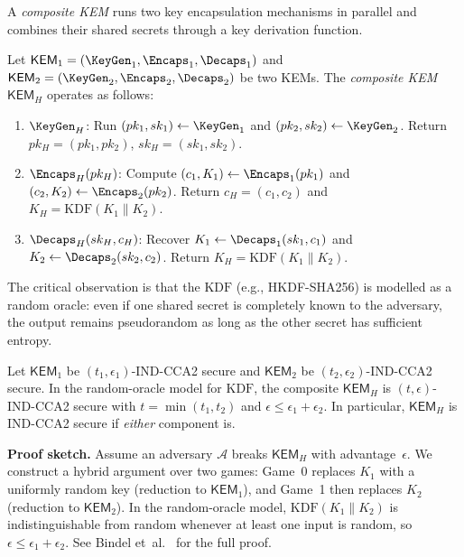 A \emph{composite KEM} runs two key encapsulation mechanisms in parallel and combines their shared secrets through a key derivation function.

\begin{definition}
\label{def:composite-kem}
Let $\mathsf{KEM}_1 = (\KeyGen_1, \Encaps_1, \Decaps_1)$ and $\mathsf{KEM}_2 = (\KeyGen_2, \Encaps_2, \Decaps_2)$ be two KEMs.  The \emph{composite KEM} $\mathsf{KEM}_H$ operates as follows:
\begin{enumerate}
\item $\KeyGen_H$: Run $(pk_1, sk_1) \gets \KeyGen_1$ and $(pk_2, sk_2) \gets \KeyGen_2$.  Return $pk_H = (pk_1, pk_2)$, $sk_H = (sk_1, sk_2)$.
\item $\Encaps_H(pk_H)$: Compute $(c_1, K_1) \gets \Encaps_1(pk_1)$ and $(c_2, K_2) \gets \Encaps_2(pk_2)$.  Return $c_H = (c_1, c_2)$ and $K_H = \mathrm{KDF}(K_1 \| K_2)$.
\item $\Decaps_H(sk_H, c_H)$: Recover $K_1 \gets \Decaps_1(sk_1, c_1)$ and $K_2 \gets \Decaps_2(sk_2, c_2)$.  Return $K_H = \mathrm{KDF}(K_1 \| K_2)$.
\end{enumerate}
\end{definition}

The critical observation is that the $\mathrm{KDF}$ (e.g., HKDF-SHA256) is modelled as a random oracle: even if one shared secret is completely known to the adversary, the output remains pseudorandom as long as the other secret has sufficient entropy.

\begin{theorem}
\label{thm:hybrid-kem-security}
Let $\mathsf{KEM}_1$ be $(t_1, \epsilon_1)$-IND-CCA2 secure and $\mathsf{KEM}_2$ be $(t_2, \epsilon_2)$-IND-CCA2 secure.  In the random-oracle model for $\mathrm{KDF}$, the composite $\mathsf{KEM}_H$ is $(t, \epsilon)$-IND-CCA2 secure with $t = \min(t_1, t_2)$ and $\epsilon \leq \epsilon_1 + \epsilon_2$.  In particular, $\mathsf{KEM}_H$ is IND-CCA2 secure if \emph{either} component is.
\end{theorem}

\begin{svgraybox}
\textbf{Proof sketch.}  Assume an adversary $\mathcal{A}$ breaks $\mathsf{KEM}_H$ with advantage~$\epsilon$.  We construct a hybrid argument over two games: Game~0 replaces $K_1$ with a uniformly random key (reduction to $\mathsf{KEM}_1$), and Game~1 then replaces $K_2$ (reduction to $\mathsf{KEM}_2$).  In the random-oracle model, $\mathrm{KDF}(K_1 \| K_2)$ is indistinguishable from random whenever at least one input is random, so $\epsilon \leq \epsilon_1 + \epsilon_2$.  See Bindel et~al.~\cite{Bindel2019} for the full proof.
\end{svgraybox}


